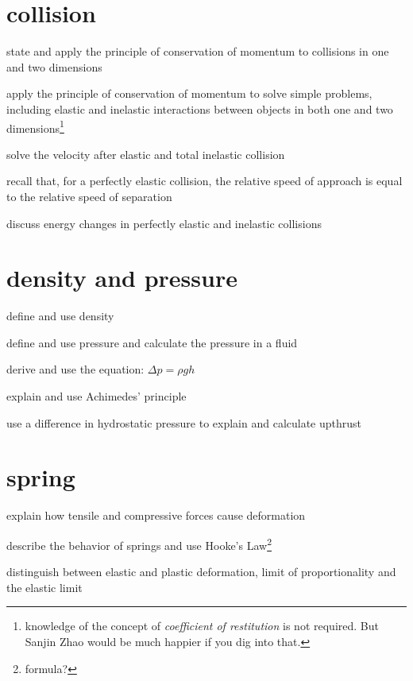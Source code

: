 \documentclass[a4paper]{tufte-handout}
\begin{document}
\section{collision}
\begin{todolist}
  \item state and apply the principle of conservation of momentum to collisions in one and two dimensions
  \item apply the principle of conservation of momentum to solve simple problems, including elastic and inelastic interactions between objects in both one and two dimensions\footnote{knowledge of the concept of \emph{coefficient of restitution} is not required. But Sanjin Zhao would be much happier if you dig into that.}
  \item solve the velocity after elastic and total inelastic collision
  \item recall that, for a perfectly elastic collision, the relative speed of approach is equal to the relative speed of separation
  \item discuss energy changes in perfectly elastic and inelastic collisions
\end{todolist}
\clearpage

\section{density and pressure}
\begin{todolist}
  \item define and use density
  \item define and use pressure and calculate the pressure in a fluid
  \item derive and use the equation: $\Delta p= \rho g h$
  \item explain and use Achimedes' principle
  \item use a difference in hydrostatic pressure to explain and calculate upthrust
\end{todolist}
\clearpage

\section{spring}
\begin{todolist}
  \item explain how tensile and compressive forces cause deformation
  \item describe the behavior of springs and use Hooke's Law\footnote{formula?}
  \item distinguish between elastic and plastic deformation, limit of proportionality and the elastic limit
\end{todolist}
\clearpage
\end{document}
